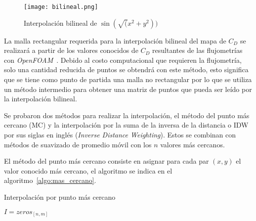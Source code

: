 \begin{figure}
    \centering
    \texttt{[image: bilineal.png]}
    \caption{Interpolación bilineal de $\sin(\sqrt(x^2 + y^2))$}\label{fig:bilineal}
\end{figure}

La malla rectangular requerida para la interpolación bilineal del mapa de
$C_{D}$ se realizará a partir de los valores conocidos de $C_D$ resultantes de
las flujometrías con \emph{OpenFOAM}~\parencite{openfoam}.
%
Debido al costo computacional que requieren la flujometría, solo una cantidad
reducida de puntos se obtendrá con este método, esto  significa que se tiene
como punto de partida una malla no rectangular por lo que se utiliza un método
intermedio para obtener una matriz de puntos que pueda ser leído por la
interpolación bilineal.

Se probaron dos métodos para realizar la interpolación, el método del punto más
cercano (MC) y la interpolación por la suma de la inversa de la distancia o IDW por
sus siglas en inglés (\emph{Inverse Distance Weighting}).
%
Estos se combinan con métodos de suavizado de promedio móvil con los $n$ valores
más cercanos.

El método del punto más cercano consiste en asignar para cada par $(x, y)$ el
valor conocido más cercano, el algoritmo se indica en el
algoritmo~\ref{algo:mas_cercano}.

\begin{algorithm}
 \caption{Interpolación por punto más cercano}\label{algo:mas_cercano}


    \BlankLine
     $I=zeros_{[n,m]}$\;
\end{algorithm}

